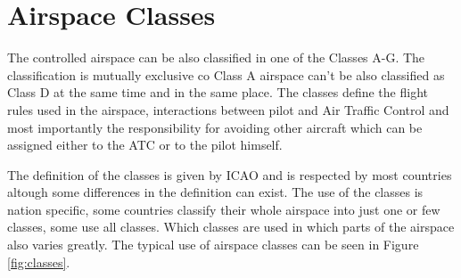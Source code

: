 

\section{Airspace Classes}

The controlled airspace can be also classified in one of the Classes A-G. The classification is mutually exclusive co Class A airspace can't be also classified as Class D at the same time and in the same place. The classes define the flight rules used in the airspace, interactions between pilot and Air Traffic Control and most importantly the responsibility for avoiding other aircraft which can be assigned either to the ATC or to the pilot himself. \cite{annex11}

The definition of the classes is given by ICAO and is respected by most countries altough some differences in the definition can exist. The use of the classes is nation specific, some countries classify their whole airspace into just one or few classes, some use all classes. Which classes are used in which parts of the airspace also varies greatly. \cite{classes} The typical use of airspace classes can be seen in Figure \ref{fig:classes}.

